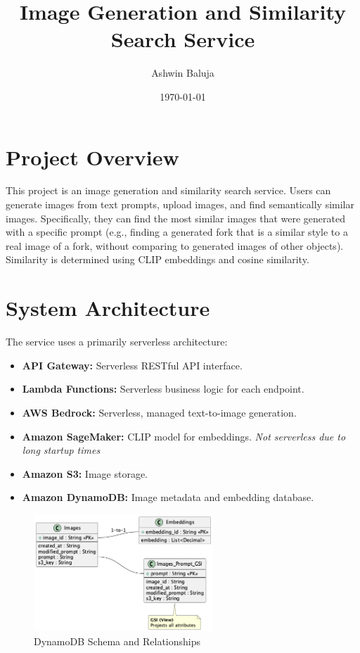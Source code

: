 \documentclass{article}
\title{Image Generation and Similarity Search Service}
\author{Ashwin Baluja}
\date{\today}
\begin{document}
\maketitle

\section{Project Overview}
This project is an image generation and similarity search service.  Users can generate images from text prompts, upload images, and find semantically similar images.  Specifically, they can find the most similar images that were generated with a specific prompt (e.g., finding a generated fork that is a similar style to a real image of a fork, without comparing to generated images of other objects). Similarity is determined using CLIP embeddings and cosine similarity.

\section{System Architecture}

The service uses a primarily serverless architecture:

\begin{itemize}[noitemsep,topsep=0pt,parsep=0pt,partopsep=0pt] %
    \item \textbf{API Gateway:} Serverless RESTful API interface.
    \item \textbf{Lambda Functions:} Serverless business logic for each endpoint.
    \item \textbf{AWS Bedrock:} Serverless, managed text-to-image generation.
    \item \textbf{Amazon SageMaker:} CLIP model for embeddings. \textit{Not serverless due to long startup times}
    \item \textbf{Amazon S3:} Image storage.
    \item \textbf{Amazon DynamoDB:} Image metadata and embedding database.
\end{itemize}

\begin{figure}[h!]
    \centering
    \includegraphics[width=0.6\textwidth]{uml/schemas.png} %
    \caption{DynamoDB Schema and Relationships}
    \label{fig:schema}
\end{figure}
\end{document}
